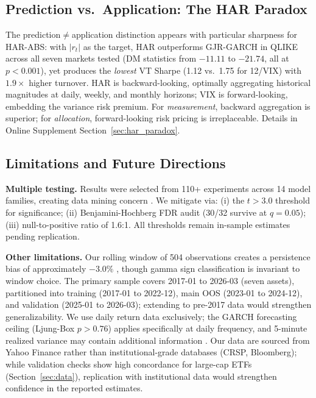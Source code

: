 \subsection{Prediction vs.\ Application: The HAR Paradox}
\label{sec:har_note_body}

The prediction$\neq$application distinction appears with particular sharpness for HAR-ABS: with $|r_t|$ as the target, HAR outperforms GJR-GARCH in QLIKE across all seven markets tested (DM statistics from $-11.11$ to $-21.74$, all at $p < 0.001$), yet produces the \textit{lowest} VT Sharpe (1.12 vs.\ 1.75 for 12/VIX) with $1.9\times$ higher turnover. HAR is backward-looking, optimally aggregating historical magnitudes at daily, weekly, and monthly horizons; VIX is forward-looking, embedding the variance risk premium. For \textit{measurement}, backward aggregation is superior; for \textit{allocation}, forward-looking risk pricing is irreplaceable. Details in Online Supplement Section~\ref{sec:har_paradox}.

\subsection{Limitations and Future Directions}

\textbf{Multiple testing.} Results were selected from 110+ experiments across 14 model families, creating data mining concern \citep{harvey2016}. We mitigate via: (i) the $t > 3.0$ threshold for significance; (ii) Benjamini-Hochberg FDR audit (30/32 survive at $q = 0.05$); (iii) null-to-positive ratio of 1.6:1. All thresholds remain in-sample estimates pending replication.

\textbf{Other limitations.} Our rolling window of 504 observations creates a persistence bias of approximately $-3.0\%$ \citep{hwang2006}, though gamma sign classification is invariant to window choice. The primary sample covers 2017-01 to 2026-03 (seven assets), partitioned into training (2017-01 to 2022-12), main OOS (2023-01 to 2024-12), and validation (2025-01 to 2026-03); extending to pre-2017 data would strengthen generalizability. We use daily return data exclusively; the GARCH forecasting ceiling (Ljung-Box $p > 0.76$) applies specifically at daily frequency, and 5-minute realized variance may contain additional information \citep{hansen2012}. Our data are sourced from Yahoo Finance rather than institutional-grade databases (CRSP, Bloomberg); while validation checks show high concordance for large-cap ETFs (Section~\ref{sec:data}), replication with institutional data would strengthen confidence in the reported estimates.

